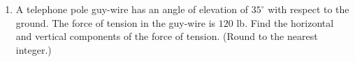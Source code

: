 \documentclass{exercises}
\begin{document}
\begin{enumerate}[resume]
\item A telephone pole guy-wire has an angle of elevation of $35^\circ$ with respect to the ground. The force of tension in the guy-wire is $120$ lb. Find the horizontal and vertical components of the force of tension. (Round to the nearest integer.)
\end{enumerate}
\end{document}
